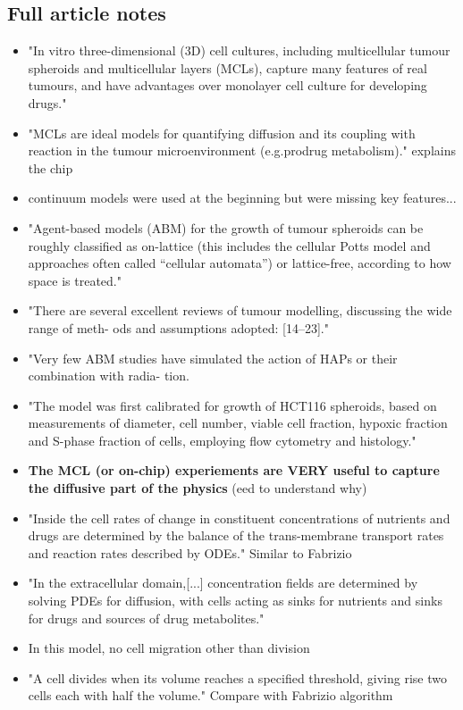 \documentclass[11pt,a4paper]{article}
\begin{document}
\subsection*{Full article notes}
\begin{itemize}
\item "In vitro three-dimensional (3D) cell cultures, including multicellular tumour spheroids and
multicellular layers (MCLs), capture many features of real tumours, and have advantages over
monolayer cell culture for developing drugs."
\item "MCLs are ideal models for quantifying diffusion and its coupling with reaction in the tumour microenvironment (e.g.prodrug metabolism)." explains the chip
\item continuum models were used at the beginning but were missing key features...
\item "Agent-based models (ABM) for the growth of tumour spheroids can be roughly classified as on-lattice (this includes the cellular Potts model and approaches often called “cellular automata”) or lattice-free, according to how space is treated."
\item "There are several excellent reviews of tumour modelling, discussing the wide range of meth-
ods and assumptions adopted: [14–23]."
\item "Very few ABM studies have simulated the action of HAPs or their combination with radia-
tion.
\item "The model was first calibrated for growth of HCT116 spheroids, based on measurements of diameter, cell number, viable cell fraction, hypoxic fraction and S-phase fraction of cells, employing flow cytometry and histology."
\item \textbf{The MCL (or on-chip) experiements are VERY useful to capture the diffusive part of the physics} (eed to understand why)
\item "Inside the cell rates of change in constituent concentrations of nutrients and drugs are determined by the balance of the trans-membrane transport rates and reaction rates described by ODEs." Similar to Fabrizio
\item "In the extracellular domain,[...] concentration fields are determined by solving PDEs for diffusion, with cells acting as sinks for nutrients and sinks for drugs and sources of drug metabolites."
\item  In this model, no cell migration other than division
\item "A cell divides when its volume reaches a specified threshold, giving rise two cells each with half the volume." Compare with Fabrizio algorithm

\end{itemize}
\end{document}

